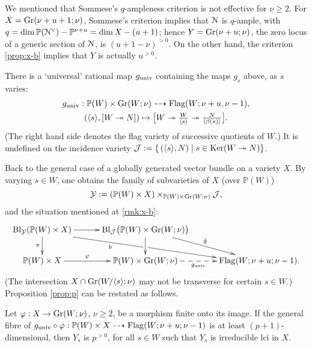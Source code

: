 \documentclass[11pt,reqno]{amsart}
\newenvironment{m-remark}{\vskip5pt\refstepcounter{stff}\trivlist \itemindent 0pt
\item[\hskip\labelsep\bf Remark~\thestff]\ignorespaces}{\endtrivlist\vskip5pt}
\let\mt\mapsto
\let\euf\EuScript
\let\cal\mathcal
\let\mbb\mathbb
\let\tld\tilde
\let\vphi\varphi
\let\lan\langle
\let\ran\rangle
\numberwithin{equation}{section}
\numberwithin{figure}{section}
\let\ges\geqslant
\let\surj\twoheadrightarrow
\begin{document}
\begin{m-remark}\label{rmk:sommese-weak}
We mentioned that Sommese's $q$-ampleness criterion is not effective for $\nu\ges 2$. 
For $X={{\rm Gr}}(\nu+u+1;\nu)$, Sommese's criterion implies that ${{\euf N}}$ is $q$-ample, 
with $q=\dim\mbb P({{\euf N}}^\vee)-\mbb P^{\nu+u}=\dim X-(u+1)$; 
hence $Y={{\rm Gr}}(\nu+u;\nu)$, the zero locus of a generic section of ${{\euf N}}$, is $(u+1-\nu)^{{>0}}$. 
On the other hand, the criterion \ref{prop:x-b} implies that $Y$ is actually $u^{{>0}}$. 
\end{m-remark}

There is a `universal' rational map $g_{\rm univ}$ containing the maps $g_s$ above, 
as $s$ varies: 
\begin{equation}\label{eq:G-grs}
\begin{array}{c}
g_{\rm univ}:\mbb P(W)\times{{\rm Gr}}(W;\nu)\dashto{{\rm Flag}}(W;\nu+u,\nu-1),
\\[1ex] 
({{\lan {s}\ran}},[W\surj N])\mt 
\bigl[W\surj\frac{W}{{{\lan {s}\ran}}}\surj\frac{N}{{{\lan {\beta(s)}\ran}}}\bigr]. 
\end{array}
\end{equation}
(The right hand side denotes the flag variety of successive quotients of $W$.)
It is undefined on the incidence variety 
$\cal J:=\{\,({{\lan {s}\ran}},N)\mid s\in{{\rm Ker}}(W\surj N)\}$. 

Back to the general case of a globally generated vector bundle on a variety $X$. 
By varying $s\in W$, one obtains the family of subvarieties of $X$ (over $\mbb P(W)$) 
$$
{{\cal Y}}:=(\mbb P(W)\times X)\times_{\mbb P(W)\times{{\rm Gr}}(W;\nu)}\cal J,
$$ 
and the situation mentioned at \ref{rmk:x-b}:
\begin{equation}\label{eq:xg}
\xymatrix@R=2em@C=3em{
{{\rm Bl}}_{{\cal Y}}(\mbb P(W)\times X)
\ar@{->}[r]\ar[d]_-\pi\ar@<-3pt>[drr]_<(.2)b|!{[r];[dr]}\hole
&
{{\rm Bl}}_{\cal J}\bigl(\mbb P(W)\times{{\rm Gr}}(W;\nu)\bigr)\ar[dr]^-{\tld g}\ar[d]
&
\\ 
\mbb P(W)\times X\ar@{->}[r]^-{\vphi}
&
\mbb P(W)\times{{\rm Gr}}(W;\nu)\ar@{-->}[r]_-{g_{\rm univ}}
&
{{\rm Flag}}(W;\nu+u;\nu-1).
}
\end{equation}
(The intersection $X\cap{{\rm Gr}}(W/{{\lan {s}\ran}};\nu)$ may not be transverse 
for certain $s\in W$.) Proposition \ref{prop:p} can be restated as follows.

\begin{m-corollary}\label{cor:grs}
Let $\vphi:X\to{{\rm Gr}}(W;\nu)$, $\nu\ges 2$, be a morphism finite onto its image. 
If the general fibre of 
$g_{\rm univ}\circ\vphi:\mbb P(W)\times X\dashto{{\rm Flag}}(W;\nu+u;\nu-1)$ 
is at least $(p+1)$-dimensional, then $Y_s$ is $p^{{>0}}$, for all $s\in W$ 
such that $Y_s$ is irreducible lci in $X$. 
\end{m-corollary}
\end{document}

